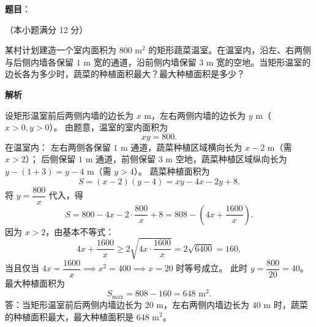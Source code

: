 \begin{answer}

\textbf{题目}：

（本小题满分 12 分）

某村计划建造一个室内面积为 $800\text{ m}^2$ 的矩形蔬菜温室。在温室内，沿左、右两侧与后侧内墙各保留 $1\text{ m}$ 宽的通道，沿前侧内墙保留 $3\text{ m}$ 宽的空地。当矩形温室的边长各为多少时，蔬菜的种植面积最大？最大种植面积是多少？

\textbf{解析}

设矩形温室前后两侧内墙的边长为 $x\text{ m}$，左右两侧内墙的边长为 $y\text{ m}$（$x>0,y>0$）。
由题意，温室的室内面积为
\nopagebreak[4]
\[
xy=800.
\]
在温室内：
左右两侧各保留 $1\text{ m}$ 通道，蔬菜种植区域横向长为 $x-2\text{ m}$（需 $x>2$）；
后侧保留 $1\text{ m}$ 通道，前侧保留 $3\text{ m}$ 空地，蔬菜种植区域纵向长为 $y-(1+3)=y-4\text{ m}$（需 $y>4$）。
蔬菜种植面积为
\nopagebreak[4]
\[
S=(x-2)(y-4)=xy-4x-2y+8.
\]
将 $y=\dfrac{800}{x}$ 代入，得
\nopagebreak[4]
\[
S=800-4x-2\cdot\frac{800}{x}+8=808-\left(4x+\frac{1600}{x}\right).
\]
因为 $x>2$，由基本不等式：
\nopagebreak[4]
\[
4x+\frac{1600}{x}\geqslant 2\sqrt{4x\cdot\frac{1600}{x}}=2\sqrt{6400}=160,
\]
当且仅当 $4x=\dfrac{1600}{x} \implies x^2=400 \implies x=20$ 时等号成立。
此时 $y=\dfrac{800}{20}=40$。
最大种植面积为
\nopagebreak[4]
\[
S_{\max}=808-160=648\text{ m}^2.
\]
答：当矩形温室前后两侧内墙边长为 $20\text{ m}$，左右两侧内墙边长为 $40\text{ m}$ 时，蔬菜的种植面积最大，最大种植面积是 $648\text{ m}^2$。


\end{answer}
